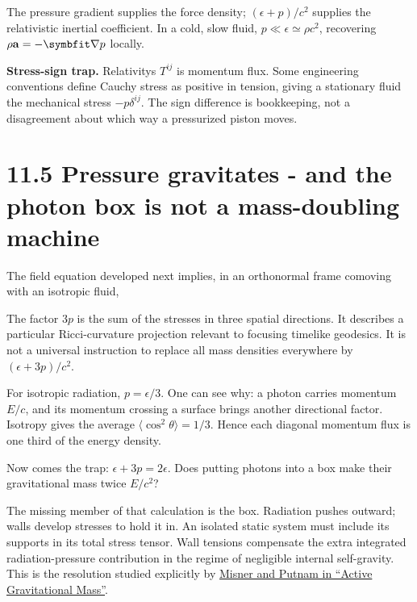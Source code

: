 \documentclass[
  11pt,
  letterpaper,
  oneside,
  openany]{scrbook}
\begin{document}
The pressure gradient supplies the force density; \((\epsilon+p)/c^2\)
supplies the relativistic inertial coefficient. In a cold, slow fluid,
\(p\ll\epsilon\simeq\rho c^2\), recovering
\(\rho\mathbf a=-\symbfit\nabla p\) locally.

\textbf{Stress-sign trap.} Relativity\textquotesingle s \(T^{ij}\) is
momentum flux. Some engineering conventions define Cauchy stress as
positive in tension, giving a stationary fluid the mechanical stress
\(-p\delta^{ij}\). The sign difference is bookkeeping, not a
disagreement about which way a pressurized piston moves.

\hypertarget{pressure-gravitates---and-the-photon-box-is-not-a-mass-doubling-machine}{%
\section{11.5 Pressure gravitates - and the photon box is not a
mass-doubling
machine}\label{pressure-gravitates---and-the-photon-box-is-not-a-mass-doubling-machine}}

The field equation developed next implies, in an orthonormal frame
comoving with an isotropic fluid,

\begin{center}
\begingroup
{}
\ifdim\wd\grmathbox>\linewidth
\resizebox{\linewidth}{!}{\usebox{\grmathbox}}
\else\usebox{\grmathbox}\fi
\endgroup
\end{center}

The factor \(3p\) is the sum of the stresses in three spatial
directions. It describes a particular Ricci-curvature projection
relevant to focusing timelike geodesics. It is not a universal
instruction to replace all mass densities everywhere by
\((\epsilon+3p)/c^2\).

For isotropic radiation, \(p=\epsilon/3\). One can see why: a photon
carries momentum \(E/c\), and its momentum crossing a surface brings
another directional factor. Isotropy gives the average
\(\langle\cos^2\theta\rangle=1/3\). Hence each diagonal momentum flux is
one third of the energy density.

Now comes the trap: \(\epsilon+3p=2\epsilon\). Does putting photons into
a box make their gravitational mass twice \(E/c^2\)?

The missing member of that calculation is the box. Radiation pushes
outward; walls develop stresses to hold it in. An isolated static system
must include its supports in its total stress tensor. Wall tensions
compensate the extra integrated radiation-pressure contribution in the
regime of negligible internal self-gravity. This is the resolution
studied explicitly by
\href{https://link.aps.org/doi/10.1103/PhysRev.116.1045}{Misner and
Putnam in ``Active Gravitational Mass''}.
\end{document}
